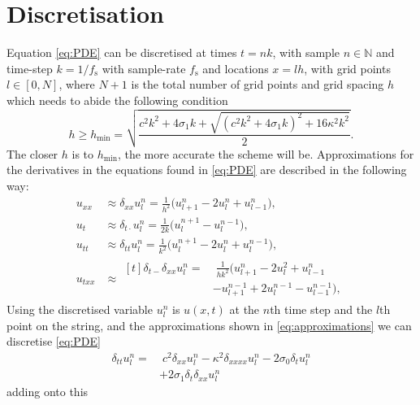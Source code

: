 \documentclass[twoside,a4paper]{article}
\begin{document}
\section{Discretisation}
Equation \eqref{eq:PDE} can be discretised at times $t = nk$, with sample $n \in \mathbb{N}$ and time-step $k = 1 / f_\text{s}$ with sample-rate $f_\text{s}$ and locations $x = lh$, with grid points $l \in [0,N]$, where $N + 1$ is the total number of grid points and grid spacing $h$ which needs to abide the following condition 
\begin{equation}
    h \geq h_\text{min} = \sqrt{\frac{c^2k^2+4 \sigma_1k+\sqrt{(c^2k^2+4\sigma_1k)^2+16\kappa^2k^2}}{2}}.
\end{equation}
The closer $h$ is to $h_\text{min}$, the more accurate the scheme will be. 
Approximations for the derivatives in the equations found in \ref{eq:PDE} are described in the following way: 
\begin{subequations}\label{eq:approximations}
    \begin{align}
        \label{eq:secondSpacex}
        u_{xx} &\approx \delta_{xx}u_l^n = \frac{1}{h^2}\big(u_{l+1}^n - 2u_l^n + u_{l-1}^n\big),\\
        \label{eq:centerTime}
        u_{t} &\approx \delta_{t\cdot} u^n_l = \frac{1}{2k}\big(u_l^{n+1}-u_l^{n-1}\big),\\
        \label{eq:secondTime}
        u_{tt} &\approx \delta_{tt}u_l^n = \frac{1}{k^2} \big(u_l^{n+1} - 2u_l^n + u_l^{n-1}\big),\\
        u_{txx} &\approx 
        \begin{aligned}[t]\delta_{t-}\delta_{xx}u_l^n =& \; \frac{1}{hk^2}\big(u_{l+1}^n - 2u_l^2 + u_{l-1}^n \\
        &- u_{l+1}^{n-1} + 2u_l^{n-1} - u_{l-1}^{n-1}\big),
        \end{aligned}
    \end{align}
\end{subequations}
Using the discretised variable $u_l^n$ is $u(x,t)$ at the $n$th time step and the $l$th point on the string, and the approximations shown in \eqref{eq:approximations} we can discretise \eqref{eq:PDE}
\begin{equation}
  \begin{aligned}
    \delta_{tt}u_l^n =& \; c^2\delta_{xx}u_l^n-\kappa^2\delta_{xxxx}u_l^n-2\sigma_0\delta_t u_l^n \\
    &+ 2\sigma_1 \delta_t\delta_{xx}u_l^n
  \end{aligned}
\end{equation}
adding onto this
\end{document}
